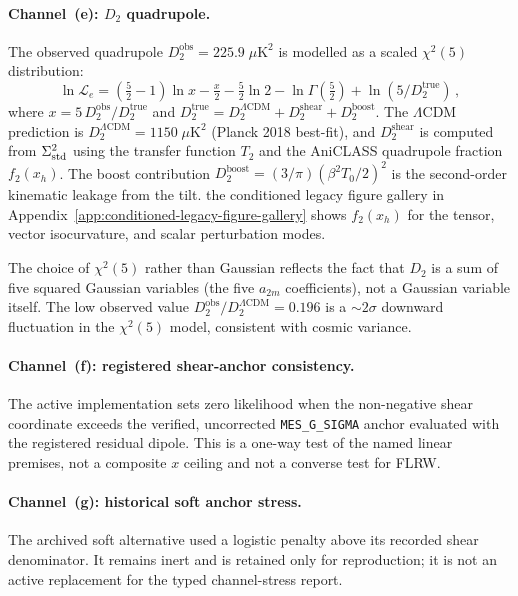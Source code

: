 \paragraph{Channel~(e): $D_2$ quadrupole.}
The observed quadrupole $D_2^{\mathrm{obs}} =
225.9\;\mu\mathrm{K}^2$ is modelled as a scaled $\chi^2(5)$
distribution:
\begin{equation}\label{eq:chi2-D2}
\ln\mathcal{L}_e
= \left(\tfrac{5}{2} - 1\right)\ln x - \tfrac{x}{2}
  - \tfrac{5}{2}\ln 2 - \ln\Gamma(\tfrac{5}{2})
  + \ln(5/D_2^{\mathrm{true}})\,,
\end{equation}
where $x = 5\,D_2^{\mathrm{obs}}/D_2^{\mathrm{true}}$ and
$D_2^{\mathrm{true}} = D_2^{\Lambda\mathrm{CDM}} +
D_2^{\mathrm{shear}} + D_2^{\mathrm{boost}}$.  The $\Lambda$CDM
prediction is $D_2^{\Lambda\mathrm{CDM}} =
1150\;\mu\mathrm{K}^2$ (Planck 2018 best-fit), and
$D_2^{\mathrm{shear}}$ is computed from $\Sigma^2_{\mathrm{std}}$ using the
transfer function $T_2$ and the AniCLASS quadrupole fraction
$f_2(x_h)$.  The boost contribution
$D_2^{\mathrm{boost}} = (3/\pi)(\beta^2 T_0/2)^2$ is the
second-order kinematic leakage from the tilt.
the conditioned legacy figure gallery in Appendix~\ref{app:conditioned-legacy-figure-gallery} shows $f_2(x_h)$ for
the tensor, vector isocurvature, and scalar perturbation modes.

The choice of $\chi^2(5)$ rather than Gaussian reflects the
fact that $D_2$ is a sum of five squared Gaussian variables
(the five $a_{2m}$ coefficients), not a Gaussian variable
itself.  The low observed value
$D_2^{\mathrm{obs}}/D_2^{\Lambda\mathrm{CDM}} = 0.196$ is a
$\sim 2\sigma$ downward fluctuation in the $\chi^2(5)$ model,
consistent with cosmic variance.

\paragraph{Channel~(f): registered shear-anchor consistency.}
The active implementation sets zero likelihood when the non-negative
shear coordinate exceeds the verified, uncorrected
\texttt{MES\_G\_SIGMA} anchor evaluated with the registered residual
dipole.  This is a one-way test of the named linear premises, not a
composite $x$ ceiling and not a converse test for FLRW.

\paragraph{Channel~(g): historical soft anchor stress.}
The archived soft alternative used a logistic penalty above its
recorded shear denominator.  It remains inert and is retained only
for reproduction; it is not an active replacement for the typed
channel-stress report.

